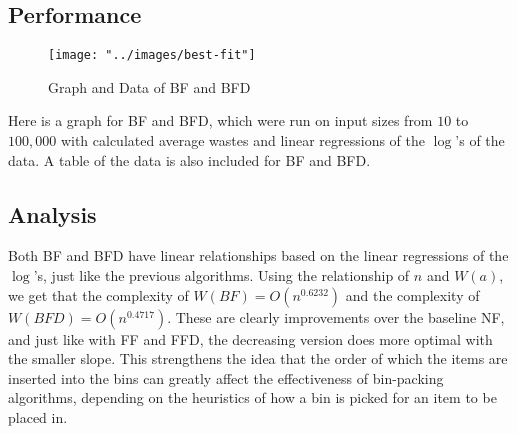 \documentclass{article}
\begin{document}
\subsection{Performance}
    \begin{figure}[H]
        \centering
        \texttt{[image: "../images/best-fit"]}
        \caption{Graph and Data of BF and BFD}
    \end{figure}
    Here is a graph for BF and BFD, which were run on input sizes from $10$ to 
    $100,000$ with calculated average wastes and linear regressions of the 
    $\log$'s of the data. A table of the data is also included for BF and BFD.
\subsection{Analysis}
    Both BF and BFD have linear relationships based on the linear regressions of
    the $\log$'s, just like the previous algorithms. Using the relationship of
    $n$ and $W(a)$, we get that the complexity of 
    $W(BF) = O\left( n^{0.6232} \right)$ and the complexity of
    $W(BFD) = O\left( n^{0.4717} \right)$. These are clearly improvements over
    the baseline NF, and just like with FF and FFD, the decreasing version does 
    more optimal with the smaller slope. This strengthens the idea that the
    order of which the items are inserted into the bins can greatly affect the
    effectiveness of bin-packing algorithms, depending on the heuristics of how
    a bin is picked for an item to be placed in.
\end{document}
